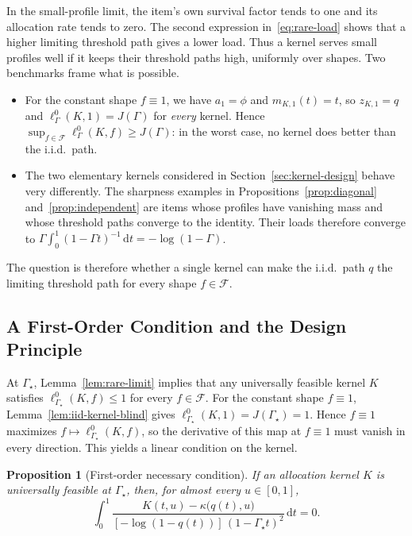 \documentclass[11pt]{article}
\newtheorem{proposition}[theorem]{Proposition}
\theoremstyle{definition}
\theoremstyle{remark}
\newcommand{\dd}{\,\mathrm d}
\begin{document}
In the small-profile limit, the item's own survival factor tends to
one and its allocation rate tends to zero.
The second expression in~\eqref{eq:rare-load} shows that a higher
limiting threshold path gives a lower load.
Thus a kernel serves small profiles well if it keeps their threshold
paths high, uniformly over shapes.
Two benchmarks frame what is possible.
\begin{itemize}
\item For the constant shape $f\equiv1$, we have $a_1=\phi$ and $m_{K,1}(t)=t$, so $z_{K,1}=q$ and $\ell^{0}_\Gamma(K,1)=J(\Gamma)$ for \emph{every} kernel.
Hence $\sup_{f\in\mathcal F}\ell^{0}_\Gamma(K,f)\ge J(\Gamma)$: in the worst case, no kernel does better than the i.i.d.\ path.
\item The two elementary kernels considered in
Section~\ref{sec:kernel-design} behave very differently.
The sharpness examples in Propositions~\ref{prop:diagonal} and~\ref{prop:independent} are items whose profiles have vanishing mass and whose threshold paths converge to the identity. Their loads therefore converge to
$\Gamma\int_0^1(1-\Gamma t)^{-1}\dd t=-\log(1-\Gamma)$.
\end{itemize}
The question is therefore whether a single kernel can make the i.i.d.\ path $q$
the limiting threshold path for every shape $f\in\mathcal F$.

\subsection{A First-Order Condition and the Design Principle}\label{sec:design-principle}
At $\Gamma_\star$, Lemma~\ref{lem:rare-limit} implies that any
universally feasible kernel $K$ satisfies
$\ell^{0}_{\Gamma_\star}(K,f)\le1$ for every $f\in\mathcal F$.
For the constant shape $f\equiv1$, Lemma~\ref{lem:iid-kernel-blind}
gives $\ell^{0}_{\Gamma_\star}(K,1)=J(\Gamma_\star)=1$.
Hence $f\equiv1$ maximizes $f\mapsto\ell^{0}_{\Gamma_\star}(K,f)$,
so the derivative of this map at $f\equiv1$ must vanish in every
direction. This yields a linear condition on the kernel.

\begin{proposition}[First-order necessary condition]\label{prop:iid-calibration}
If an allocation kernel $K$ is universally feasible at $\Gamma_\star$, then, for almost every $u\in[0,1]$,
\begin{equation}\label{eq:iid-calibration}
 \int_0^1
 \frac{K(t,u)-\kappa\bigl(q(t),u\bigr)}
 {[-\log(1-q(t))]\,(1-\Gamma_\star t)^2}\dd t=0.
\end{equation}
\end{proposition}
\end{document}
